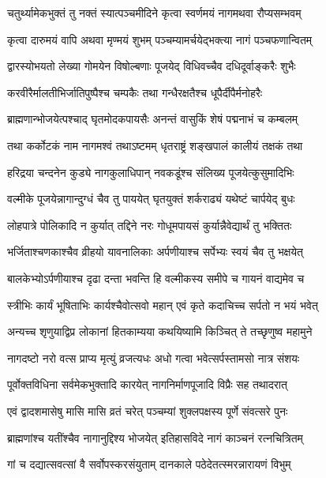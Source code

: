\twolineshloka
{चतुर्थ्यामेकभुक्तं तु नक्तं स्यात्पञ्चमीदिने}
{कृत्वा स्वर्णमयं नागमथवा रौप्यसम्भवम्} %

\twolineshloka
{कृत्वा दारुमयं वापि अथवा मृण्मयं शुभम्}
{पञ्चम्यामर्चयेद्भक्त्या नागं पञ्चफणान्वितम्} %

\twolineshloka
{द्वारस्योभयतो लेख्या गोमयेन विषोल्बणाः}
{पूजयेद् विधिवच्चैव दधिदूर्वाङ्करैः शुभैः} %

\twolineshloka
{करवीरैर्मालतीभिर्जातिपुष्पैश्च चम्पकैः}
{तथा गन्धैरक्षतैश्च धूपैर्दीपैर्मनोहरैः} %

\twolineshloka
{ब्राह्मणान्भोजयेत्पश्चाद् घृतमोदकपायसैः}
{अनन्तं वासुकिं शेषं पद्मनाभं च कम्बलम्} %

\twolineshloka
{तथा कर्कोटकं नाम नागमश्वं तथाऽष्टमम्}
{धृतराष्ट्रं शङ्खपालं कालीयं तक्षकं तथा} %

\twolineshloka
{हरिद्रया चन्दनेन कुड्ये नागकुलाधिपान्}
{नवकडूंश्च संलिख्य पूजयेत्कुसुमादिभिः} %

\twolineshloka
{वल्मीके पूजयेन्नागान्दुग्धं चैव तु पाययेत्}
{घृतयुक्तं शर्कराढ्यं यथेष्टं चार्पयेद् बुधः} %

\twolineshloka
{लोहपात्रे पोलिकादि न कुर्यात् तद्दिने नरः}
{गोधूमपायसं कुर्यान्नैवेद्यार्थं तु भक्तितः} %

\twolineshloka
{भर्जिताश्चणकाश्चैव व्रीहयो यावनालिकाः}
{अर्पणीयाश्च सर्पेभ्यः स्वयं चैव तु भक्षयेत्} %

\twolineshloka
{बालकेभ्योऽर्पणीयाश्च दृढा दन्ता भवन्ति हि}
{वल्मीकस्य समीपे च गायनं वाद्यमेव च} %

\twolineshloka
{स्त्रीभिः कार्यं भूषिताभिः कार्यश्चैवोत्सवो महान्}
{एवं कृते कदाचिच्च सर्पतो न भयं भवेत्} %

\twolineshloka
{अन्यच्च शृणुयाद्विप्र लोकानां हितकाम्यया}
{कथयिष्यामि किञ्चित् ते तच्छृणुष्व महामुने} %

\twolineshloka
{नागदष्टो नरो वत्स प्राप्य मृत्युं व्रजत्यधः}
{अधो गत्वा भवेत्सर्पस्तामसो नात्र संशयः} %

\twolineshloka
{पूर्वोक्तविधिना सर्वमेकभुक्तादि कारयेत्}
{नागनिर्माणपूजादि विप्रैः सह तथादरात्} %

\twolineshloka
{एवं द्वादशमासेषु मासि मासि व्रतं चरेत्}
{पञ्चम्यां शुक्लपक्षस्य पूर्णे संवत्सरे पुनः} %

\twolineshloka
{ब्राह्मणांश्च यतींश्चैव नागानुद्दिश्य भोजयेत्}
{इतिहासविदे नागं काञ्चनं रत्नचित्रितम्} %

\twolineshloka
{गां च दद्यात्सवत्सां वै सर्वोपस्करसंयुताम्}
{दानकाले पठेदेतत्स्मरन्नारायणं विभुम्} %

